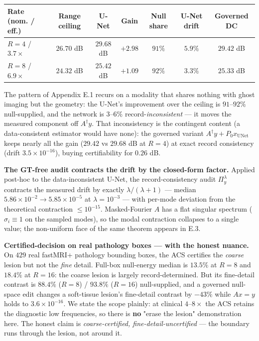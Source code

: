 \documentclass[11pt]{article}
\begin{document}
\begin{center}\begin{tabular}{lcccccc}
\toprule
Rate (nom. / eff.) & Range ceiling & U-Net & Gain & Null share & U-Net drift & Governed DC \\
\midrule
$R{=}4$ / $3.7\times$ & $26.70$ dB & $29.68$ dB & $+2.98$ & $91\%$ & $5.9\%$ & $29.42$ dB \\
$R{=}8$ / $6.9\times$ & $24.32$ dB & $25.42$ dB & $+1.09$ & $92\%$ & $3.3\%$ & $25.33$ dB \\
\bottomrule
\end{tabular}\end{center}

The pattern of Appendix E.1 recurs on a modality that shares nothing with ghost imaging but the geometry: the U-Net's improvement over the ceiling is $91$--$92\%$ null-supplied, and the network is $3$--$6\%$ record-\textit{inconsistent} --- it moves the measured component off $A^\dagger y$. That inconsistency is the contingent content (a data-consistent estimator would have none): the governed variant $A^\dagger y + P_0 x_{\mathrm{UNet}}$ keeps nearly all the gain ($29.42$ vs $29.68$ dB at $R{=}4$) at exact record consistency (drift $3.5\times10^{-16}$), buying certifiability for $0.26$ dB.

\textbf{The GT-free audit contracts the drift by the closed-form factor.} Applied post-hoc to the data-inconsistent U-Net, the record-consistency audit $\Pi_y^\lambda$ contracts the measured drift by exactly $\lambda/(\lambda+1)$ --- median $5.86\times10^{-2}\to5.85\times10^{-5}$ at $\lambda=10^{-3}$ --- with per-mode deviation from the theoretical contraction $\le10^{-15}$. Masked-Fourier $A$ has a flat singular spectrum ($\sigma_i\equiv1$ on the sampled modes), so the modal contraction collapses to a single value; the non-uniform face of the same theorem appears in E.3.

\textbf{Certified-decision on real pathology boxes --- with the honest nuance.} On $429$ real fastMRI+ pathology bounding boxes, the ACS certifies the \textit{coarse} lesion but not the \textit{fine} detail. Full-box null-energy median is $13.5\%$ at $R{=}8$ and $18.4\%$ at $R{=}16$: the coarse lesion is largely record-determined. But its fine-detail contrast is $88.4\%$ ($R{=}8$) / $93.8\%$ ($R{=}16$) null-supplied, and a governed null-space edit changes a soft-tissue lesion's fine-detail contrast by $-43\%$ while $Ax=y$ holds to $3.6\times10^{-16}$. We state the scope plainly: at clinical $4$--$8\times$ the ACS retains the diagnostic low frequencies, so there is \textbf{no} "erase the lesion" demonstration here. The honest claim is \textit{coarse-certified, fine-detail-uncertified} --- the boundary runs through the lesion, not around it.
\end{document}
